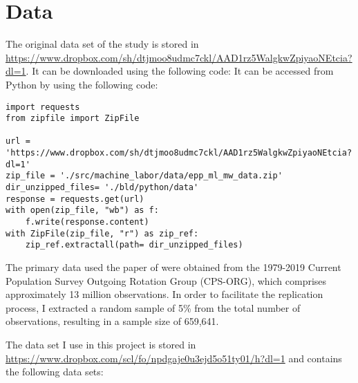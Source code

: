\documentclass[11pt, a4paper, leqno]{article}
\begin{document}
\section{Data} %
\label{sec:data}

The original data set of the study is stored in 
\url{https://www.dropbox.com/sh/dtjmoo8udmc7ckl/AAD1rz5WalgkwZpiyaoNEtcia?dl=1}. It can be downloaded using the following code:
It can be accessed from Python by using the following code:

\lstset{language=Python}
\lstset{frame=lines}
\begin{lstlisting}
import requests
from zipfile import ZipFile

url = 'https://www.dropbox.com/sh/dtjmoo8udmc7ckl/AAD1rz5WalgkwZpiyaoNEtcia?dl=1'
zip_file = './src/machine_labor/data/epp_ml_mw_data.zip'
dir_unzipped_files= './bld/python/data'
response = requests.get(url)
with open(zip_file, "wb") as f:
    f.write(response.content)
with ZipFile(zip_file, "r") as zip_ref:
    zip_ref.extractall(path= dir_unzipped_files)
\end{lstlisting}

The primary data used the paper of \citet{cengiz2022seeing} were obtained 
from the 1979-2019 Current Population Survey Outgoing Rotation Group (CPS-ORG), 
which comprises approximately 13 million observations. In order to facilitate 
the replication process, I extracted a random sample of 5\% 
from the total number of observations, resulting in a sample size of 659,641.

The data set I use in this project is stored in 
\url{https://www.dropbox.com/scl/fo/npdgaje0u3ejd5o51ty01/h?dl=1} 
and contains the following data sets:
\end{document}
